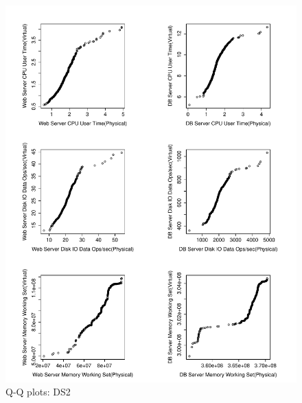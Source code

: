 
\begin{figure}[thb]
	\centering
	\includegraphics[width=0.9\columnwidth]{figures/qqplots_DS2.pdf}
	\caption{Q-Q plots: DS2}
	\label{fig:Results Table}
\end{figure}



